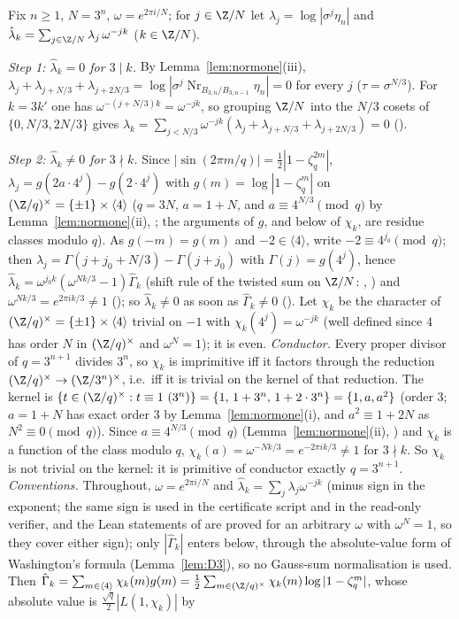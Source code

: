 Fix $n\ge1$, $N=3^n$, $\omega=e^{2\pi i/N}$; for $j\in\Z/N$ let $\lambda_j=\log|\sigma^j\eta_n|$ and $\hat\lambda_k=\sum_{j\in\Z/N}\lambda_j\,\omega^{-jk}$ ($k\in\Z/N$).

\emph{Step 1: $\hat\lambda_k=0$ for $3\mid k$.} By Lemma~\ref{lem:normone}(iii), $\lambda_j+\lambda_{j+N/3}+\lambda_{j+2N/3}=\log|\sigma^j\operatorname{Nr}_{B_{3,n}/B_{3,n-1}}\eta_n|=0$ for every $j$ ($\tau=\sigma^{N/3}$). For $k=3k'$ one has $\omega^{-(j+N/3)k}=\omega^{-jk}$, so grouping $\Z/N$ into the $N/3$ cosets of $\{0,N/3,2N/3\}$ gives $\hat\lambda_k=\sum_{j<N/3}\omega^{-jk}(\lambda_j+\lambda_{j+N/3}+\lambda_{j+2N/3})=0$ ().

\emph{Step 2: $\hat\lambda_k\ne0$ for $3\nmid k$.} Since $|\sin(2\pi m/q)|=\frac12|1-\zeta_q^{2m}|$, $\lambda_j=g(2a\cdot4^j)-g(2\cdot4^j)$ with $g(m)=\log|1-\zeta_q^m|$ on $(\Z/q)^\times=\{\pm1\}\times\langle4\rangle$ ($q=3N$, $a=1+N$, and $a\equiv4^{N/3}\pmod q$ by Lemma~\ref{lem:normone}(ii), ; the arguments of $g$, and below of $\chi_k$, are residue classes modulo $q$). As $g(-m)=g(m)$ and $-2\in\langle4\rangle$, write $-2\equiv4^{j_0}\pmod q$; then $\lambda_j=\Gamma(j+j_0+N/3)-\Gamma(j+j_0)$ with $\Gamma(j)=g(4^j)$, hence $\hat\lambda_k=\omega^{j_0k}(\omega^{Nk/3}-1)\hat\Gamma_k$ (shift rule of the twisted sum on $\Z/N$: , ) and $\omega^{Nk/3}=e^{2\pi ik/3}\ne1$ (); so $\hat\lambda_k\ne0$ as soon as $\hat\Gamma_k\ne0$ (). Let $\chi_k$ be the character of $(\Z/q)^\times=\{\pm1\}\times\langle4\rangle$ trivial on $-1$ with $\chi_k(4^j)=\omega^{-jk}$ (well defined since $4$ has order $N$ in $(\Z/q)^\times$ and $\omega^N=1$); it is even. \emph{Conductor.} Every proper divisor of $q=3^{n+1}$ divides $3^n$, so $\chi_k$ is imprimitive iff it factors through the reduction $(\Z/q)^\times\to(\Z/3^n)^\times$, i.e.\ iff it is trivial on the kernel of that reduction. The kernel is $\{t\in(\Z/q)^\times:t\equiv1\ (3^n)\}=\{1,\,1+3^n,\,1+2\cdot3^n\}=\{1,a,a^2\}$ (order $3$; $a=1+N$ has exact order $3$ by Lemma~\ref{lem:normone}(i), and $a^2\equiv1+2N$ as $N^2\equiv0\pmod q$). Since $a\equiv4^{N/3}\pmod q$ (Lemma~\ref{lem:normone}(ii), ) and $\chi_k$ is a function of the class modulo $q$, $\chi_k(a)=\omega^{-Nk/3}=e^{-2\pi ik/3}\ne1$ for $3\nmid k$. So $\chi_k$ is not trivial on the kernel: it is primitive of conductor exactly $q=3^{n+1}$. \emph{Conventions.} Throughout, $\omega=e^{2\pi i/N}$ and $\hat\lambda_k=\sum_j\lambda_j\omega^{-jk}$ (minus sign in the exponent; the same sign is used in the certificate script and in the read-only verifier, and the Lean statements of  are proved for an arbitrary $\omega$ with $\omega^N=1$, so they cover either sign); only $|\hat\Gamma_k|$ enters below, through the absolute-value form of Washington's formula (Lemma~\ref{lem:D3}), so no Gauss-sum normalisation is used. Then $\hat\Gamma_k=\sum_{m\in\langle4\rangle}\chi_k(m)g(m)=\frac12\sum_{m\in(\Z/q)^\times}\chi_k(m)\log|1-\zeta_q^m|$, whose absolute value is $\frac{\sqrt q}2|L(1,\chi_k)|$ by 